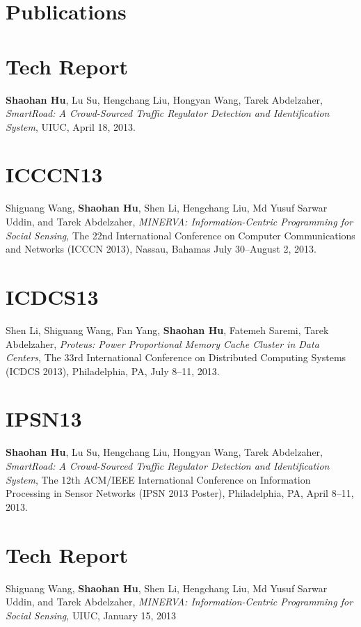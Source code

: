 \section{\sc Publications}

\section{\sc Tech Report}
\textbf{Shaohan Hu}, Lu Su, Hengchang Liu, Hongyan Wang, Tarek
Abdelzaher, \emph{SmartRoad: A Crowd-Sourced Traffic Regulator
  Detection and Identification System}, \textsf{UIUC}, April 18, 2013.

\section{\sc ICCCN13}
Shiguang Wang, \textbf{Shaohan Hu}, Shen Li, Hengchang Liu, Md Yusuf
Sarwar Uddin, and Tarek Abdelzaher, \emph{MINERVA: Information-Centric
  Programming for Social Sensing}, \textsf{The 22nd International
  Conference on Computer Communications and Networks (ICCCN 2013)},
Nassau, Bahamas July 30--August 2, 2013.

\section{\sc ICDCS13}
Shen Li, Shiguang Wang, Fan Yang, \textbf{Shaohan Hu}, Fatemeh Saremi,
Tarek Abdelzaher, \emph{Proteus: Power Proportional Memory Cache
  Cluster in Data Centers}, \textsf{The 33rd International Conference
  on Distributed Computing Systems (ICDCS 2013)}, Philadelphia, PA,
July 8--11, 2013.

\section{\sc IPSN13}
\textbf{Shaohan Hu}, Lu Su, Hengchang Liu, Hongyan Wang, Tarek
Abdelzaher, \emph{SmartRoad: A Crowd-Sourced Traffic Regulator
  Detection and Identification System}, \textsf{The 12th ACM/IEEE
  International Conference on Information Processing in Sensor
  Networks (IPSN 2013 Poster)}, Philadelphia, PA, April 8--11, 2013.

\section{\sc Tech Report}
Shiguang Wang, \textbf{Shaohan Hu}, Shen Li, Hengchang Liu, Md Yusuf
Sarwar Uddin, and Tarek Abdelzaher, \emph{MINERVA: Information-Centric
  Programming for Social Sensing}, \textsf{UIUC}, January 15, 2013


